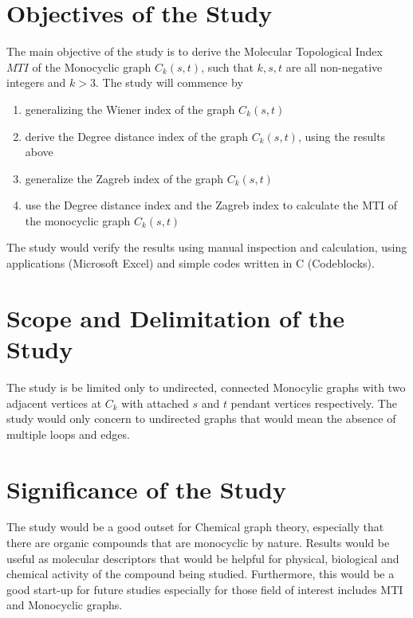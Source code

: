 \section{Objectives of the Study}
The main objective of the study is to derive the Molecular Topological Index $MTI$ of the Monocyclic graph $C_k(s,t)$, such that $k,s,t$ are all non-negative integers and $k> 3$. The study will commence by 

\begin{enumerate}
\item generalizing the Wiener index of the graph $C_k(s,t)$
\item derive the Degree distance index of the graph $C_k(s,t)$, using the results above
\item generalize the Zagreb index of the graph $C_k(s,t)$
\item use the Degree distance index and the Zagreb index to calculate the MTI of the monocyclic graph $C_k(s,t)$
\end{enumerate}

The study would verify the results using manual inspection and calculation, using applications (Microsoft Excel) and simple codes written in C (Codeblocks).

\section{Scope and Delimitation of the Study}
The study is be limited only to undirected, connected Monocylic graphs with two adjacent vertices at $C_k$ with attached $s$ and $t$ pendant vertices respectively. The study would only concern to undirected graphs that would mean the absence of multiple loops and edges.

\section{Significance of the Study}
The study would be a good outset for Chemical graph theory, especially that there are organic compounds that are monocyclic by nature. Results would be useful as molecular descriptors that would be helpful for physical, biological and chemical activity of the compound being studied. Furthermore, this would be a good start-up for future studies especially for those field of interest includes MTI and Monocyclic graphs.

